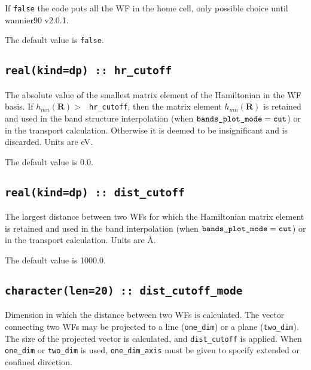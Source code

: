 If {\tt false} the code puts all the WF in the home cell, only possible choice until wannier90 v2.0.1.

The default value is {\tt false}.

\subsection[hr\_cutoff]{\tt real(kind=dp) :: hr\_cutoff}

The absolute value of the smallest matrix element of the
Hamiltonian in the WF basis.
If $h_{mn}(\mathbf{R})>\:${\tt
  hr\_cutoff}, then the matrix element
$h_{mn}(\mathbf{R})$ is retained and used in
the band structure interpolation (when $\verb#bands_plot_mode#=\verb#cut#$)
or in the transport calculation.
Otherwise it is deemed to be insignificant
and is discarded. Units are eV.


The default value is 0.0.

\subsection[dist\_cutoff]{\tt real(kind=dp) :: dist\_cutoff}

The largest distance between two WFs for which
the Hamiltonian matrix element is retained and used in
the band interpolation (when $\verb#bands_plot_mode#=\verb#cut#$)
or in the transport calculation. Units are \AA. 

The default value is 1000.0.

\subsection[dist\_cutoff\_mode]{\tt character(len=20) :: dist\_cutoff\_mode}

Dimension in which the distance between two WFs is calculated.
The vector connecting two WFs may be projected
to a line (\verb#one_dim#) or a plane (\verb#two_dim#).
The size of the projected vector 
is calculated, and \verb#dist_cutoff# is applied.
When \verb#one_dim# or \verb#two_dim#
is used, \verb#one_dim_axis# must be given
to specify extended or confined direction.

